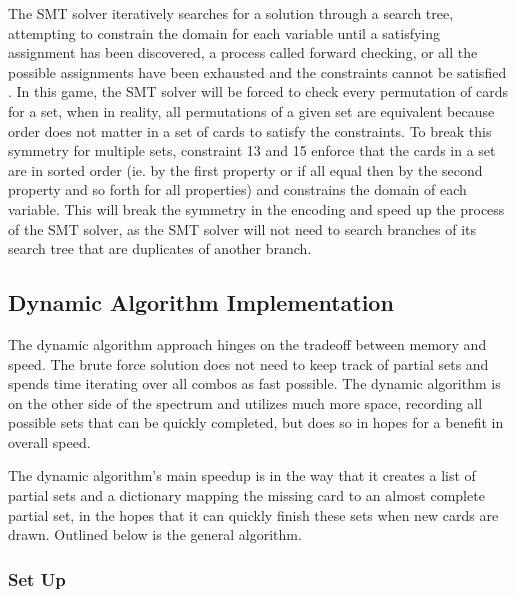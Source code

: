 \documentclass[pageno]{jpaper}
\begin{document}
The SMT solver iteratively searches for a solution through a search tree, attempting to constrain the domain for each variable until a satisfying assignment has been discovered, a process called forward checking, or all the possible assignments have been exhausted and the constraints cannot be satisfied \cite{search_from_AI}. In this game, the SMT solver will be forced to check every permutation of cards for a set, when in reality, all permutations of a given set are equivalent because order does not matter in a set of cards to satisfy the constraints. To break this symmetry for multiple sets, constraint 13 and 15 enforce that the cards in a set are in sorted order (ie. by the first property or if all equal then by the second property and so forth for all properties) and constrains the domain of each variable. This will break the symmetry in the encoding and speed up the process of the SMT solver, as the SMT solver will not need to search branches of its search tree that are duplicates of another branch. 

\subsection{Dynamic Algorithm Implementation}

The dynamic algorithm approach hinges on the tradeoff between memory and speed. The brute force solution does not need to keep track of partial sets and spends time iterating over all combos as fast possible. The dynamic algorithm is on the other side of the spectrum and utilizes much more space, recording all possible sets that can be quickly completed, but does so in hopes for a benefit in overall speed. 

The dynamic algorithm's main speedup is in the way that it creates a list of partial sets and a dictionary mapping the missing card to an almost complete partial set, in the hopes that it can quickly finish these sets when new cards are drawn. Outlined below is the general algorithm. 

\subsubsection{Set Up}
\end{document}
